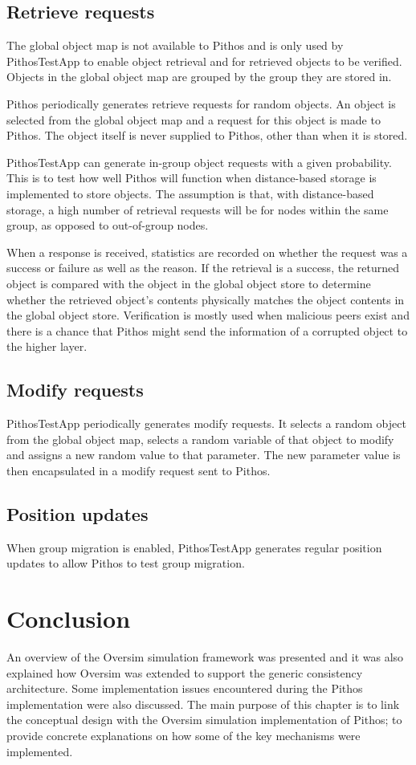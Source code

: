 \subsection{Retrieve requests}

The global object map is not available to Pithos and is only used by PithosTestApp to enable object retrieval and for retrieved objects to be verified. Objects in the global object map are grouped by the group they are stored in.

Pithos periodically generates retrieve requests for random objects. An object is selected from the global object map and a request for this object is made to Pithos. The object itself is never supplied to Pithos, other than when it is stored.

PithosTestApp can generate in-group object requests with a given probability. This is to test how well Pithos will function when distance-based storage is implemented to store objects. The assumption is that, with distance-based storage, a high number of retrieval requests will be for nodes within the same group, as opposed to out-of-group nodes.

When a response is received, statistics are recorded on whether the request was a success or failure as well as the reason. If the retrieval is a success, the returned object is compared with the object in the global object store to determine whether the retrieved object's contents physically matches the object contents in the global object store. Verification is mostly used when malicious peers exist and there is a chance that Pithos might send the information of a corrupted object to the higher layer.

\subsection{Modify requests}

PithosTestApp periodically generates modify requests. It selects a random object from the global object map, selects a random variable of that object to modify and assigns a new random value to that parameter. The new parameter value is then encapsulated in a modify request sent to Pithos.

\subsection{Position updates}

When group migration is enabled, PithosTestApp generates regular position updates to allow Pithos to test group migration.

\section{Conclusion}

An overview of the Oversim simulation framework was presented and it was also explained how Oversim was extended to support the generic consistency architecture. Some implementation issues encountered during the Pithos implementation were also discussed. The main purpose of this chapter is to link the conceptual design with the Oversim simulation implementation of Pithos; to provide concrete explanations on how some of the key mechanisms were implemented.
